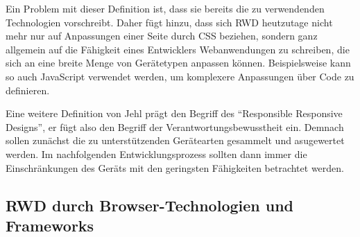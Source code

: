 Ein Problem mit dieser Definition ist, dass sie bereits die zu verwendenden Technologien vorschreibt.
Daher fügt \autocite[S. 28]{Laati.ImplementingResponsiveDesignInIndustrialDashboardEditor.2017} hinzu, dass sich RWD heutzutage nicht mehr nur auf Anpassungen einer Seite durch CSS beziehen, sondern ganz allgemein auf die Fähigkeit eines Entwicklers Webanwendungen zu schreiben, die sich an eine breite Menge von Gerätetypen anpassen können.
Beispielsweise kann so auch JavaScript verwendet werden, um komplexere Anpassungen über Code zu definieren.

Eine weitere Definition von Jehl \autocite{Jehl.ResponsibleResponsiveWebDesign.2014} prägt den Begriff des "`Responsible Responsive Designs"', er fügt also den Begriff der Verantwortungsbewusstheit ein.
Demnach sollen zunächst die zu unterstützenden Gerätearten gesammelt und asugewertet werden.
Im nachfolgenden Entwicklungsprozess sollten dann immer die Einschränkungen des Geräts mit den geringsten Fähigkeiten betrachtet werden.


\subsection{RWD durch Browser-Technologien und Frameworks}
